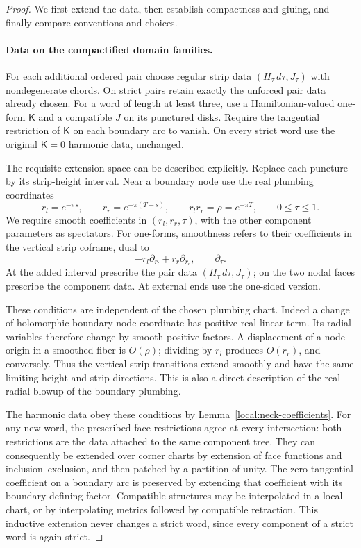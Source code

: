 \documentclass[11pt]{article}
\theoremstyle{definition}
\theoremstyle{remark}
\numberwithin{equation}{section}
\begin{document}
\begin{proof}
We first extend the data, then establish compactness and gluing, and
finally compare conventions and choices.

\paragraph{Data on the compactified domain families.}
For each additional ordered pair choose regular strip data
\((H_\tau\,d\tau,J_\tau)\) with nondegenerate chords.  On strict pairs
retain exactly the unforced pair data already chosen.
For a word of length at least three, use a Hamiltonian-valued one-form
\(\mathsf K\) and a compatible \(J\) on its punctured disks.
Require the tangential restriction of \(\mathsf K\) on each boundary arc
to vanish.  On every strict word use the original \(\mathsf K=0\)
harmonic data, unchanged.

The requisite extension space can be described explicitly.
Replace each puncture by its strip-height interval.  Near a boundary
node use the real plumbing coordinates
\[
 r_l=e^{-\pi s},\qquad r_r=e^{-\pi(T-s)},\qquad
 r_l r_r=\rho=e^{-\pi T},\qquad 0\le\tau\le1.
\]
We require smooth coefficients in
\((r_l,r_r,\tau)\), with the other component parameters as spectators.
For one-forms, smoothness refers to their coefficients in the vertical
strip coframe, dual to
\[
 -r_l\partial_{r_l}+r_r\partial_{r_r},
 \qquad \partial_\tau.
\]
At the added interval prescribe the pair data
\((H_\tau\,d\tau,J_\tau)\); on the two nodal faces prescribe the
component data.  At external ends use the one-sided version.

These conditions are independent of the chosen plumbing chart.
Indeed a change of holomorphic boundary-node coordinate has positive
real linear term.  Its radial variables therefore change by smooth
positive factors.  A displacement of a node origin in a smoothed fiber
is \(O(\rho)\); dividing by \(r_l\) produces \(O(r_r)\), and conversely.
Thus the vertical strip transitions extend smoothly and have the same
limiting height and strip directions.  This is also a direct description
of the real radial blowup of the boundary plumbing.

The harmonic data obey these conditions by
Lemma~\ref{local:neck-coefficients}.
For any new word, the prescribed face restrictions agree at every
intersection: both restrictions are the data attached to the same
component tree.  They can consequently be extended over corner charts
by extension of face functions and inclusion--exclusion, and then
patched by a partition of unity.  The zero tangential coefficient on a
boundary arc is preserved by extending that coefficient with its
boundary defining factor.  Compatible structures may be interpolated
in a local chart, or by interpolating metrics followed by compatible
retraction.  This inductive extension never changes a strict word,
since every component of a strict word is again strict.


\end{proof}
\end{document}

